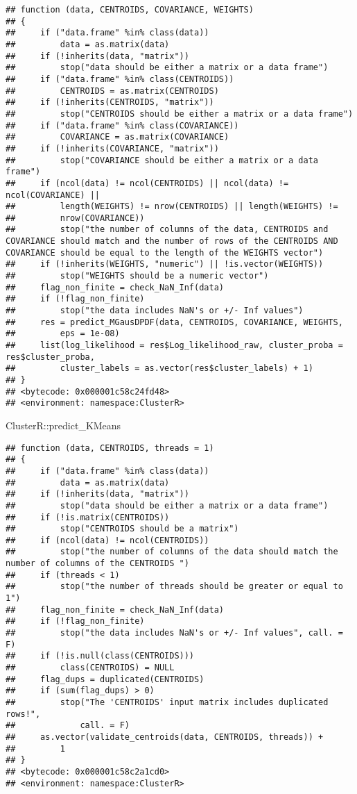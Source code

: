 \documentclass[
]{article}
\newenvironment{Shaded}{\begin{snugshade}}{\end{snugshade}}
\newcommand{\NormalTok}[1]{#1}
\newcommand{\SpecialCharTok}[1]{\textcolor[rgb]{0.00,0.00,0.00}{#1}}
\begin{document}
\begin{verbatim}
## function (data, CENTROIDS, COVARIANCE, WEIGHTS) 
## {
##     if ("data.frame" %in% class(data)) 
##         data = as.matrix(data)
##     if (!inherits(data, "matrix")) 
##         stop("data should be either a matrix or a data frame")
##     if ("data.frame" %in% class(CENTROIDS)) 
##         CENTROIDS = as.matrix(CENTROIDS)
##     if (!inherits(CENTROIDS, "matrix")) 
##         stop("CENTROIDS should be either a matrix or a data frame")
##     if ("data.frame" %in% class(COVARIANCE)) 
##         COVARIANCE = as.matrix(COVARIANCE)
##     if (!inherits(COVARIANCE, "matrix")) 
##         stop("COVARIANCE should be either a matrix or a data frame")
##     if (ncol(data) != ncol(CENTROIDS) || ncol(data) != ncol(COVARIANCE) || 
##         length(WEIGHTS) != nrow(CENTROIDS) || length(WEIGHTS) != 
##         nrow(COVARIANCE)) 
##         stop("the number of columns of the data, CENTROIDS and COVARIANCE should match and the number of rows of the CENTROIDS AND COVARIANCE should be equal to the length of the WEIGHTS vector")
##     if (!inherits(WEIGHTS, "numeric") || !is.vector(WEIGHTS)) 
##         stop("WEIGHTS should be a numeric vector")
##     flag_non_finite = check_NaN_Inf(data)
##     if (!flag_non_finite) 
##         stop("the data includes NaN's or +/- Inf values")
##     res = predict_MGausDPDF(data, CENTROIDS, COVARIANCE, WEIGHTS, 
##         eps = 1e-08)
##     list(log_likelihood = res$Log_likelihood_raw, cluster_proba = res$cluster_proba, 
##         cluster_labels = as.vector(res$cluster_labels) + 1)
## }
## <bytecode: 0x000001c58c24fd48>
## <environment: namespace:ClusterR>
\end{verbatim}

\begin{Shaded}
\begin{Highlighting}[]
\NormalTok{ClusterR}\SpecialCharTok{::}\NormalTok{predict\_KMeans}
\end{Highlighting}
\end{Shaded}

\begin{verbatim}
## function (data, CENTROIDS, threads = 1) 
## {
##     if ("data.frame" %in% class(data)) 
##         data = as.matrix(data)
##     if (!inherits(data, "matrix")) 
##         stop("data should be either a matrix or a data frame")
##     if (!is.matrix(CENTROIDS)) 
##         stop("CENTROIDS should be a matrix")
##     if (ncol(data) != ncol(CENTROIDS)) 
##         stop("the number of columns of the data should match the number of columns of the CENTROIDS ")
##     if (threads < 1) 
##         stop("the number of threads should be greater or equal to 1")
##     flag_non_finite = check_NaN_Inf(data)
##     if (!flag_non_finite) 
##         stop("the data includes NaN's or +/- Inf values", call. = F)
##     if (!is.null(class(CENTROIDS))) 
##         class(CENTROIDS) = NULL
##     flag_dups = duplicated(CENTROIDS)
##     if (sum(flag_dups) > 0) 
##         stop("The 'CENTROIDS' input matrix includes duplicated rows!", 
##             call. = F)
##     as.vector(validate_centroids(data, CENTROIDS, threads)) + 
##         1
## }
## <bytecode: 0x000001c58c2a1cd0>
## <environment: namespace:ClusterR>
\end{verbatim}
\end{document}
